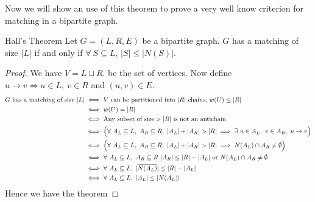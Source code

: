 \documentclass[twoside]{article}
\begin{document}
Now we will show an use of this theorem to prove a very well know criterion for matching in a bipartite graph.
\begin{Theorem}{Hall's Theorem}{}
	Let $G=(L,R,E)$ be a bipartite graph. $G$ has a matching of size $|L|$ if and only if $\forall \ S\subseteq L$, $|S|\leq |N(S)|$.
\end{Theorem}
\begin{proof}
	We have  $V=L\sqcup R$. be the set of vertices. Now define $u\to v\iff u\in L,\ v\in R$ and $(u,v)\in E$. \begin{align*}
		G\text{ has a matching of size }|L|&\iff V\text{ can be partitioned into }|R|\text{ chains, }w(U)\leq |R|\\
		&\iff w(U)=|R|\\
		&\iff \text{Any subset of size}>|R|\text{ is not an antichain}\\
		& \iff \Big(\forall\ A_L\subseteq L,\ A_R\subseteq R,\ |A_L|+|A_R|>|R|\implies \exs\ u\in A_L,\ v\in A_R,\ u\to v\Big)\\
		& \iff \Big(\forall\ A_L\subseteq L,\ A_R\subseteq R,\ |A_L|+|A_R|>|R|\implies N(A_L)\cap A_R\neq\emptyset\Big)\\
		& \iff \forall\ A_L\subseteq L,\ A_R\subseteq R\ |A_R|\leq |R|-|A_L| \text{ or }N(A_L)\cap A_R\neq\emptyset\\
		& \iff \forall\ A_L\subseteq L,\ |\ov{N(A_L)}|\leq |R|-|A_L|\\
		& \iff \forall\ A_L\subseteq L,\ |A_L|\leq |N(A_L)|
	\end{align*}Hence we have the theorem
\end{proof}
\end{document}
